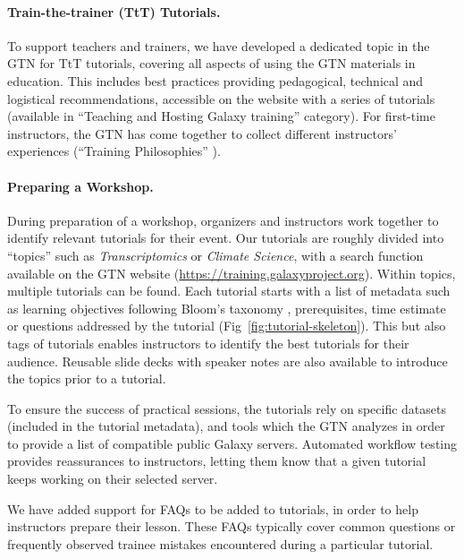 \paragraph{Train-the-trainer (TtT) Tutorials.}
To support teachers and trainers, we have developed a dedicated topic in the GTN for TtT tutorials, covering all aspects of using the GTN materials in education. This includes best practices providing pedagogical, technical and logistical recommendations, accessible on the website with a series of tutorials (available in ``Teaching and Hosting Galaxy training'' category). For first-time instructors, the GTN has come together to collect different instructors' experiences (``Training Philosophies'' \cite{gtn-philosophies}).

\paragraph{Preparing a Workshop.} During preparation of a workshop, organizers and instructors work together to identify relevant tutorials for their event. Our tutorials are roughly divided into ``topics'' such as \emph{Transcriptomics} or \emph{Climate Science}, with a search function available on the GTN website (\url{https://training.galaxyproject.org}). Within topics, multiple tutorials can be found. Each tutorial starts with a list of metadata such as learning objectives following Bloom's taxonomy \cite{Bloom1956}, prerequisites, time estimate or questions addressed by the tutorial (Fig~\ref{fig:tutorial-skeleton}). This but also tags of tutorials enables instructors to identify the best tutorials for their audience. Reusable slide decks with speaker notes are also available to introduce the topics prior to a tutorial. 

To ensure the success of practical sessions, the tutorials rely on specific datasets (included in the tutorial metadata), and tools which the GTN analyzes in order to provide a list of compatible public Galaxy servers. Automated workflow testing \cite{galaxy-workflow-testing} provides reassurances to instructors, letting them know that a given tutorial keeps working on their selected server.

We have added support for FAQs to be added to tutorials, in order to help instructors prepare their lesson. These FAQs typically cover common questions or frequently observed trainee mistakes encountered during a particular tutorial.


